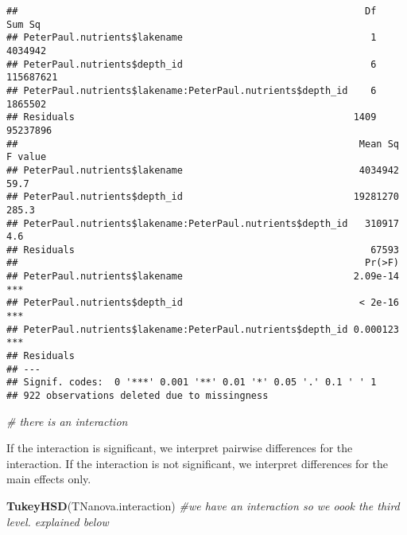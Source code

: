 \documentclass[]{article}
\newenvironment{Shaded}{\begin{snugshade}}{\end{snugshade}}
\newcommand{\KeywordTok}[1]{\textcolor[rgb]{0.13,0.29,0.53}{\textbf{#1}}}
\newcommand{\CommentTok}[1]{\textcolor[rgb]{0.56,0.35,0.01}{\textit{#1}}}
\newcommand{\NormalTok}[1]{#1}
\begin{document}
\begin{verbatim}
##                                                             Df    Sum Sq
## PeterPaul.nutrients$lakename                                 1   4034942
## PeterPaul.nutrients$depth_id                                 6 115687621
## PeterPaul.nutrients$lakename:PeterPaul.nutrients$depth_id    6   1865502
## Residuals                                                 1409  95237896
##                                                            Mean Sq F value
## PeterPaul.nutrients$lakename                               4034942    59.7
## PeterPaul.nutrients$depth_id                              19281270   285.3
## PeterPaul.nutrients$lakename:PeterPaul.nutrients$depth_id   310917     4.6
## Residuals                                                    67593        
##                                                             Pr(>F)    
## PeterPaul.nutrients$lakename                              2.09e-14 ***
## PeterPaul.nutrients$depth_id                               < 2e-16 ***
## PeterPaul.nutrients$lakename:PeterPaul.nutrients$depth_id 0.000123 ***
## Residuals                                                             
## ---
## Signif. codes:  0 '***' 0.001 '**' 0.01 '*' 0.05 '.' 0.1 ' ' 1
## 922 observations deleted due to missingness
\end{verbatim}

\begin{Shaded}
\begin{Highlighting}[]
\CommentTok{# there is an interaction}
\end{Highlighting}
\end{Shaded}

If the interaction is significant, we interpret pairwise differences for
the interaction. If the interaction is not significant, we interpret
differences for the main effects only.

\begin{Shaded}
\begin{Highlighting}[]
\KeywordTok{TukeyHSD}\NormalTok{(TNanova.interaction) }\CommentTok{#we have an interaction so we oook the third level. explained below}
\end{Highlighting}
\end{Shaded}
\end{document}
